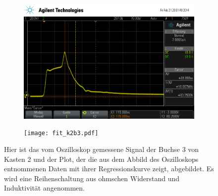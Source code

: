 \begin{figure}[]
  \centering
  \begin{subfigure}{0.45\textwidth}
    \includegraphics[width=\textwidth]{k2b3.png}
  \end{subfigure}
  \quad
  \begin{subfigure}{0.45\textwidth}
    \texttt{[image: fit\_k2b3.pdf]}
  \end{subfigure}

  \caption{Hier ist das vom Oszilloskop gemessene Signal der Buchse 3
    von Kasten 2 und der Plot, der die aus dem Abbild des Oszilloskops
    entnommenen Daten mit ihrer Regressionskurve zeigt, abgebildet.  Es
    wird eine Reihenschaltung aus ohmschen Widerstand und Induktivität
    angenommen.}
  \label{fig:k2b3}
\end{figure}

